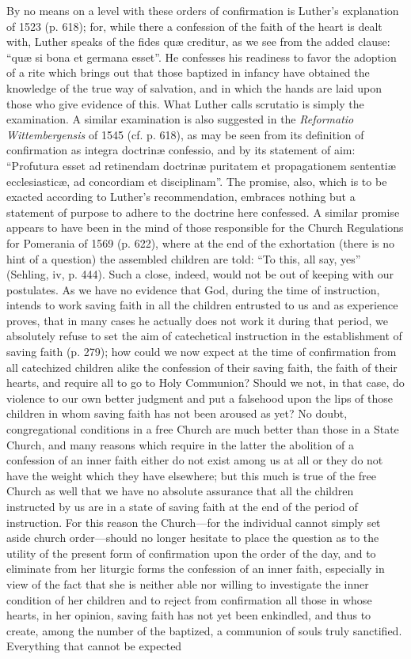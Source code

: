 By no means on a level with these orders of confirmation is Luther’s explanation of 1523 (p. 618); for, while there a confession of the faith of the heart is dealt with, Luther speaks of the fides quæ creditur, as we see from the added clause: “quæ si bona et germana esset”. He confesses his readiness to favor the adoption of a rite which brings out that those baptized in infancy have obtained the knowledge of the true way of salvation, and in which the hands are laid upon those who give evidence of this. What Luther calls scrutatio is simply the examination. A similar examination is also suggested in the \emph{Reformatio Wittembergensis} of 1545 (cf. p. 618), as may be seen from its definition of confirmation as integra doctrinæ confessio, and by its statement of aim: “Profutura esset ad retinendam doctrinæ puritatem et propagationem sententiæ ecclesiasticæ, ad concordiam et disciplinam”. The promise, also, which is to be exacted according to Luther’s recommendation, embraces nothing but a statement of purpose to adhere to the doctrine here confessed. A similar promise appears to have been in the mind of those responsible for the Church Regulations for Pomerania of 1569
(p. 622), where at the end of the exhortation (there is no hint of a question) the assembled children are told: “To this, all say, yes” (Sehling, iv, p. 444). Such a close, indeed, would not be out of keeping with our postulates. As we have no evidence that God, during the time of instruction, intends to work saving faith in all the children entrusted to us and as experience proves, that in many cases he actually does not work it during that period, we absolutely refuse to set the aim of catechetical instruction in the establishment of saving faith (p. 279); how could we now expect at the time of confirmation from all catechized children alike the confession of their saving faith, the faith of their hearts, and require all to go to Holy Communion? Should we not, in that case, do violence to our own better judgment and put a falsehood upon the lips of those children in whom saving faith has not been aroused as yet? No doubt, congregational conditions in a free Church are much better than those in a State Church, and many reasons which require in the latter the abolition of a confession of an inner faith either do not exist among us at all or they do not have the weight which they have elsewhere; but this much is true of the free Church as well that we have no absolute assurance that all the children instructed by us are in a state of saving faith at the end of the period of instruction. For this reason the Church—for the individual cannot simply set aside church order—should no longer hesitate to place the question as to the utility of the present form of confirmation upon the order of the day, and to eliminate from her liturgic forms the confession of an inner faith, especially in view of the fact that she is neither able nor willing to investigate the inner condition of her children and to reject from confirmation all those in whose hearts, in her opinion, saving faith has not yet been enkindled, and thus to create, among the number of the baptized, a communion of souls truly sanctified. Everything that cannot be expected
